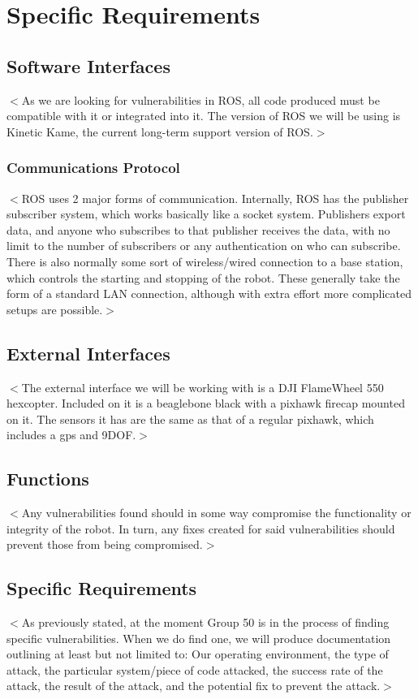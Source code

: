 \documentclass{scrreprt}
\begin{document}
\chapter{Specific Requirements}

\section{Software Interfaces}
$<$As we are looking for vulnerabilities in ROS, all code produced must be compatible with it or integrated into it. The version of ROS we will be using is Kinetic Kame, the current long-term support version of ROS.$>$

\subsection{Communications Protocol}
$<$ROS uses 2 major forms of communication. Internally, ROS has the publisher subscriber system, which works basically like a socket system.
Publishers export data, and anyone who subscribes to that publisher receives the data, with no limit to the number of
subscribers or any authentication on who can subscribe. There is also normally some sort of wireless/wired connection to a base
station, which controls the starting and stopping of the robot. These generally take the form of a standard LAN connection,
although with extra effort more complicated setups are possible.$>$

\section{External Interfaces}
$<$The external interface we will be working with is a DJI FlameWheel 550 hexcopter.
Included on it is a beaglebone black with a pixhawk firecap mounted on it.
The sensors it has are the same as that of a regular pixhawk, which includes a gps and 9DOF.$>$

\section{Functions}
$<$Any vulnerabilities found should in some way compromise the functionality or integrity of the robot. In turn, any fixes created for said vulnerabilities should prevent those from being compromised.$>$

\section{Specific Requirements}
$<$As previously stated, at the moment Group 50 is in the process of finding specific vulnerabilities. When we do find one, we will produce documentation outlining at least but not limited to:
Our operating environment, the type of attack, the particular system/piece of code attacked, the success rate of the attack, the result of the attack, and the potential fix to prevent the attack.$>$
\end{document}
